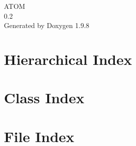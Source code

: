 \documentclass[twoside]{book}
\newcommand{\+}{\discretionary{\mbox{\scriptsize$\hookleftarrow$}}{}{}}
\newcommand{\clearemptydoublepage}{%
    \newpage{\pagestyle{empty}\cleardoublepage}%
  }
\begin{document}
  \raggedbottom
    \hypersetup{pageanchor=false,
                bookmarksnumbered=true,
                pdfencoding=unicode
               }
  \begin{titlepage}
  \vspace*{7cm}
  \begin{center}%
  {\Large ATOM}\\
  [1ex]\large 0.\+2 \\
  \vspace*{1cm}
  {\large Generated by Doxygen 1.9.8}\\
  \end{center}
  \end{titlepage}
  \clearemptydoublepage
  \tableofcontents
  \clearemptydoublepage
  \hypersetup{pageanchor=true}



\chapter{Hierarchical Index}

\chapter{Class Index}

\chapter{File Index}

\end{document}
